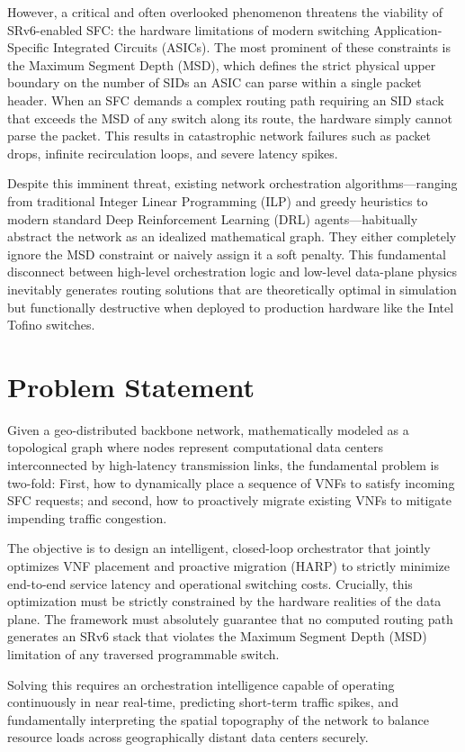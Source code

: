 \documentclass[12pt, a4paper, reqno, oneside]{book}
\begin{document}
However, a critical and often overlooked phenomenon threatens the viability of SRv6-enabled SFC: the hardware limitations of modern switching Application-Specific Integrated Circuits (ASICs). The most prominent of these constraints is the Maximum Segment Depth (MSD), which defines the strict physical upper boundary on the number of SIDs an ASIC can parse within a single packet header. When an SFC demands a complex routing path requiring an SID stack that exceeds the MSD of any switch along its route, the hardware simply cannot parse the packet. This results in catastrophic network failures such as packet drops, infinite recirculation loops, and severe latency spikes. 

Despite this imminent threat, existing network orchestration algorithms—ranging from traditional Integer Linear Programming (ILP) and greedy heuristics to modern standard Deep Reinforcement Learning (DRL) agents—habitually abstract the network as an idealized mathematical graph. They either completely ignore the MSD constraint or naively assign it a soft penalty. This fundamental disconnect between high-level orchestration logic and low-level data-plane physics inevitably generates routing solutions that are theoretically optimal in simulation but functionally destructive when deployed to production hardware like the Intel Tofino switches.

\section{Problem Statement}
Given a geo-distributed backbone network, mathematically modeled as a topological graph where nodes represent computational data centers interconnected by high-latency transmission links, the fundamental problem is two-fold: First, how to dynamically place a sequence of VNFs to satisfy incoming SFC requests; and second, how to proactively migrate existing VNFs to mitigate impending traffic congestion. 

The objective is to design an intelligent, closed-loop orchestrator that jointly optimizes VNF placement and proactive migration (HARP) to strictly minimize end-to-end service latency and operational switching costs. Crucially, this optimization must be strictly constrained by the hardware realities of the data plane. The framework must absolutely guarantee that no computed routing path generates an SRv6 stack that violates the Maximum Segment Depth (MSD) limitation of any traversed programmable switch. 

Solving this requires an orchestration intelligence capable of operating continuously in near real-time, predicting short-term traffic spikes, and fundamentally interpreting the spatial topography of the network to balance resource loads across geographically distant data centers securely.
\end{document}
